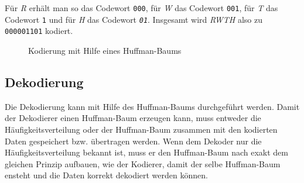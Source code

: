 \documentclass[twoside,11pt,a4paper]{article}
\theoremstyle{break}
\begin{document}
Für \emph{R} erhält man so das Codewort {\tt000}, für \emph{W} das
Codewort {\tt001}, für \emph{T} das Codewort {\tt1} und für \emph{H}
das Codewort \emph{\tt01}. Insgesamt wird \emph{RWTH} also zu
{\tt000001101} kodiert.


\begin{figure}[h]
\centering
{}
\caption{Kodierung mit Hilfe eines Huffman-Baums} \label{fig:HKOD}
\end{figure}

\subsection{Dekodierung} \label{sec:huffman-dec}
Die Dekodierung kann mit Hilfe des Huffman-Baums durchgeführt
werden. Damit der Dekodierer einen Huffman-Baum erzeugen kann, muss
entweder die Häufigkeitsverteilung oder der Huffman-Baum zusammen mit
den kodierten Daten gespeichert bzw. übertragen werden. Wenn dem
Dekoder nur die Häufigkeitsverteilung bekannt ist, muss er den
Huffman-Baum nach exakt dem gleichen Prinzip aufbauen, wie der
Kodierer, damit der selbe Huffman-Baum ensteht und die Daten korrekt
dekodiert werden können.
\end{document}
